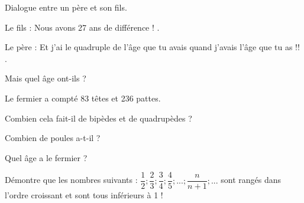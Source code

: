 \begin{enigme}
Dialogue entre un père et son fils.

Le fils : \og  Nous avons 27 ans de différence ! \fg.

Le père : \og  Et j'ai le quadruple de l'âge que tu avais quand j'avais l'âge que tu as !! \fg.

Mais quel âge ont-ils ?
\end{enigme}

\vspace{2em}

\begin{enigme}[À la ferme]
Le fermier a compté 83 têtes et 236 pattes.

Combien cela fait-il de bipèdes et de quadrupèdes ?

Combien de poules a-t-il ?

Quel âge a le fermier ?
\end{enigme}

\vspace{2em}

\begin{enigme}
Démontre que les nombres suivants : $\dfrac{1}{2} ; \dfrac{2}{3} ; \dfrac{3}{4} ; \dfrac{4}{5} ; ... ; \dfrac{n}{n+1} ; ...$ sont rangés dans l'ordre croissant et sont tous inférieurs à 1 !
\end{enigme}






